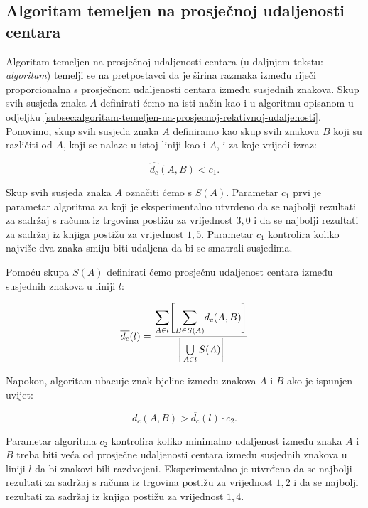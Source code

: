 \documentclass[times, utf8, zavrsni]{fer}
\begin{document}
\subsection{Algoritam temeljen na prosječnoj udaljenosti centara}
Algoritam temeljen na prosječnoj udaljenosti centara (u daljnjem tekstu:
\emph{algoritam}) temelji se na pretpostavci da je širina razmaka između riječi
proporcionalna s prosječnom udaljenosti centara između susjednih znakova.
Skup svih susjeda znaka $A$ definirati ćemo na isti način kao i u algoritmu
opisanom u odjeljku
\ref{subsec:algoritam-temeljen-na-prosjecnoj-relativnoj-udaljenosti}. Ponovimo,
skup svih susjeda znaka $A$ definiramo kao skup svih znakova $B$ koji su
različiti od $A$, koji se nalaze u istoj liniji kao i $A$, i za koje vrijedi
izraz:

\begin{equation}
\hat{d_c}(A, B) < c_1 \texttt{.}
\end{equation}

Skup svih susjeda znaka $A$ označiti ćemo s $S(A)$. Parametar $c_1$ prvi je
parametar algoritma za koji je eksperimentalno utvrđeno
da se najbolji rezultati za sadržaj s računa iz trgovina postižu za vrijednost
$3{,}0$ i da se najbolji rezultati za sadržaj iz knjiga postižu za vrijednost
$1{,}5$. Parametar $c_1$ kontrolira koliko najviše dva znaka smiju biti udaljena
da bi se smatrali susjedima.

Pomoću skupa $S(A)$ definirati ćemo prosječnu udaljenost centara između
susjednih znakova u liniji $l$:

\begin{equation}
\overline{d_c}(l) =
\frac{
    \mathlarger{\sum}\limits_{A \in l}
    \Bigg[
    \mathlarger{\sum}\limits_{B \in S(A)} d_c(A, B)
    \Bigg]
}
{\bigg|\bigcup\limits_{A \in l} S(A)\bigg|}
\end{equation}

Napokon, algoritam ubacuje znak bjeline između znakova $A$ i $B$ ako je ispunjen
uvijet:

\begin{equation}
d_c(A, B) > \overline{d_c}(l) \cdot c_2 \texttt{.}
\end{equation}

Parametar algoritma $c_2$ kontrolira koliko minimalno udaljenost između znaka
$A$ i $B$ treba biti veća od prosječne udaljenosti centara između susjednih
znakova u liniji $l$ da bi znakovi bili razdvojeni. Eksperimentalno je utvrđeno
da se najbolji rezultati za sadržaj s računa iz trgovina postižu za vrijednost
$1{,}2$ i da se najbolji rezultati za sadržaj iz knjiga postižu za vrijednost
$1{,}4$.
\end{document}
